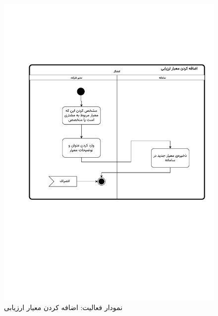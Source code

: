 \begin{figure}[ht!]
	\centering
	\includegraphics[scale=0.8, page=1]{figs/OOD-activity-addeval.pdf}
	\caption{نمودار فعالیت: اضافه کردن معیار ارزیابی}
\end{figure}
\FloatBarrier
\newpage

